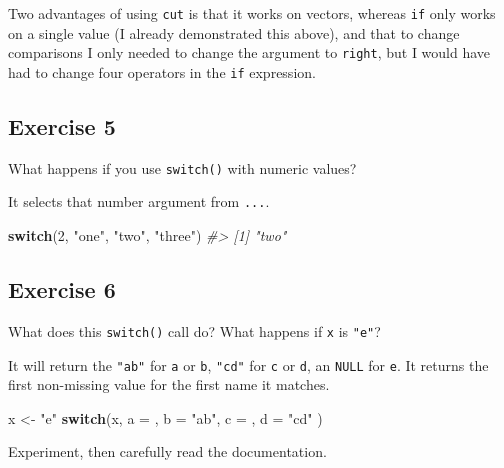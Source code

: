 \documentclass[]{book}
\newenvironment{Shaded}{\begin{snugshade}}{\end{snugshade}}
\newcommand{\CommentTok}[1]{\textcolor[rgb]{0.56,0.35,0.01}{\textit{#1}}}
\newcommand{\ControlFlowTok}[1]{\textcolor[rgb]{0.13,0.29,0.53}{\textbf{#1}}}
\newcommand{\DataTypeTok}[1]{\textcolor[rgb]{0.13,0.29,0.53}{#1}}
\newcommand{\DecValTok}[1]{\textcolor[rgb]{0.00,0.00,0.81}{#1}}
\newcommand{\NormalTok}[1]{#1}
\newcommand{\StringTok}[1]{\textcolor[rgb]{0.31,0.60,0.02}{#1}}
\theoremstyle{definition}
\theoremstyle{definition}
\theoremstyle{definition}
\theoremstyle{remark}
\begin{document}
Two advantages of using \texttt{cut} is that it works on vectors,
whereas \texttt{if} only works on a single value (I already demonstrated
this above), and that to change comparisons I only needed to change the
argument to \texttt{right}, but I would have had to change four
operators in the \texttt{if} expression.

\hypertarget{exercise-5-13}{%
\subsection{Exercise 5}\label{exercise-5-13}}

What happens if you use \texttt{switch()} with numeric values?

It selects that number argument from \texttt{...}.

\begin{Shaded}
\begin{Highlighting}[]
\ControlFlowTok{switch}\NormalTok{(}\DecValTok{2}\NormalTok{, }\StringTok{"one"}\NormalTok{, }\StringTok{"two"}\NormalTok{, }\StringTok{"three"}\NormalTok{)}
\CommentTok{#> [1] "two"}
\end{Highlighting}
\end{Shaded}

\hypertarget{exercise-6-10}{%
\subsection{Exercise 6}\label{exercise-6-10}}

What does this \texttt{switch()} call do? What happens if \texttt{x} is
\texttt{"e"}?

It will return the \texttt{"ab"} for \texttt{a} or \texttt{b},
\texttt{"cd"} for \texttt{c} or \texttt{d}, an \texttt{NULL} for
\texttt{e}. It returns the first non-missing value for the first name it
matches.

\begin{Shaded}
\begin{Highlighting}[]
\NormalTok{x <-}\StringTok{ "e"}
\ControlFlowTok{switch}\NormalTok{(x, }
  \DataTypeTok{a =}\NormalTok{ ,}
  \DataTypeTok{b =} \StringTok{"ab"}\NormalTok{,}
  \DataTypeTok{c =}\NormalTok{ ,}
  \DataTypeTok{d =} \StringTok{"cd"}
\NormalTok{)}
\end{Highlighting}
\end{Shaded}

Experiment, then carefully read the documentation.
\end{document}
